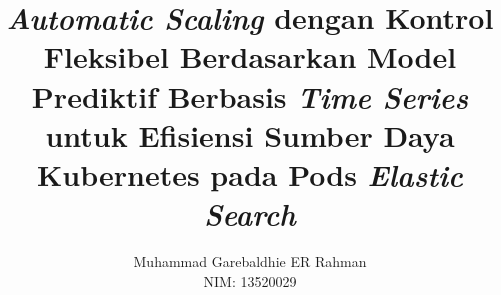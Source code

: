 \documentclass[bahasa, 12pt, a4paper, onecolumn, oneside, final]{report}
\begin{document}
\title{\textit{Automatic Scaling} dengan Kontrol Fleksibel Berdasarkan Model Prediktif Berbasis \textit{Time Series} untuk Efisiensi Sumber Daya Kubernetes pada Pods \textit{Elastic Search}}
\date{}
\author{
    Muhammad Garebaldhie ER Rahman \\
    NIM: 13520029
}
\newcommand\tanggalpengesahan{17 Desember 2023}




% 

\pagestyle{plain}



% 







% 
% 
% 
% 
% 
\end{document}
